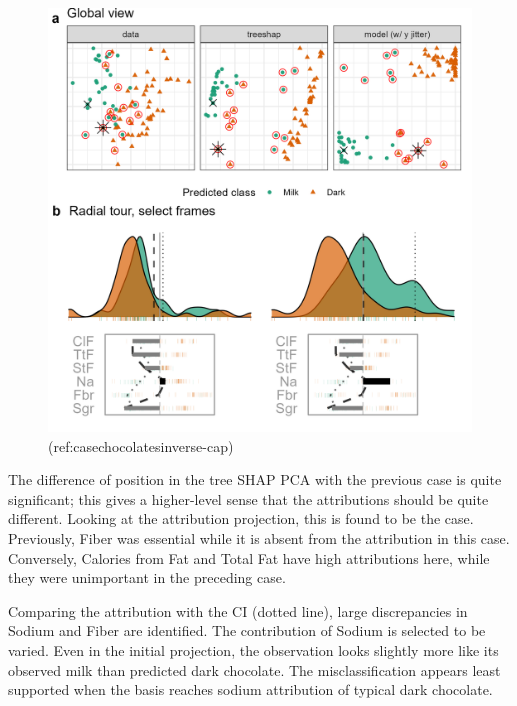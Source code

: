 \documentclass[
]{jss}
\begin{document}
\begin{CodeChunk}
\begin{figure}

{\centering \includegraphics[width=1\linewidth]{./figures/case_chocolates_inverse} 

}

\caption[(ref:casechocolatesinverse-cap)]{(ref:casechocolatesinverse-cap)}\label{fig:casechocolatesinverse}
\end{figure}
\end{CodeChunk}

The difference of position in the tree SHAP PCA with the previous case
is quite significant; this gives a higher-level sense that the
attributions should be quite different. Looking at the attribution
projection, this is found to be the case. Previously, Fiber was
essential while it is absent from the attribution in this case.
Conversely, Calories from Fat and Total Fat have high attributions here,
while they were unimportant in the preceding case.

Comparing the attribution with the CI (dotted line), large discrepancies
in Sodium and Fiber are identified. The contribution of Sodium is
selected to be varied. Even in the initial projection, the observation
looks slightly more like its observed milk than predicted dark
chocolate. The misclassification appears least supported when the basis
reaches sodium attribution of typical dark chocolate.
\end{document}
